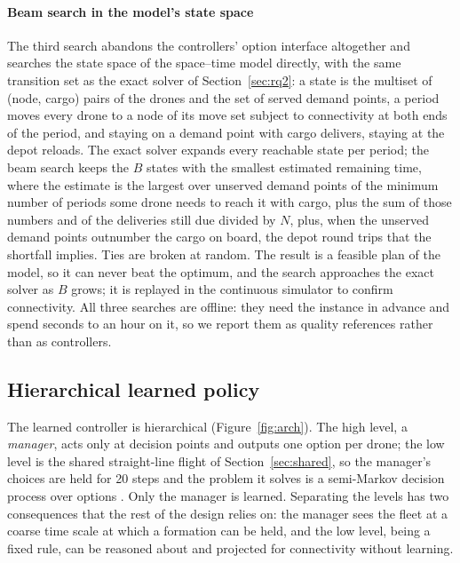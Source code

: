 \documentclass[final,5p,times,twocolumn]{elsarticle}
\begin{document}
\paragraph{Beam search in the model's state space}
The third search abandons the controllers' option interface altogether and searches the state
space of the space--time model directly, with the same transition set as the exact solver of
Section~\ref{sec:rq2}: a state is the multiset of (node, cargo) pairs of the drones and the set of
served demand points, a period moves every drone to a node of its move set subject to
connectivity at both ends of the period, and staying on a demand point with cargo delivers,
staying at the depot reloads. The exact solver expands every reachable state per period; the beam
search keeps the $B$ states with the smallest estimated remaining time, where the estimate is the
largest over unserved demand points of the minimum number of periods some drone needs to reach it
with cargo, plus the sum of those numbers and of the deliveries still due divided by $N$, plus,
when the unserved demand points outnumber the cargo on board, the depot round trips that the
shortfall implies. Ties are broken at random. The result is a feasible plan of the model, so it
can never beat the optimum, and the search approaches the exact solver as $B$ grows; it is
replayed in the continuous simulator to confirm connectivity. All three searches are offline: they
need the instance in advance and spend seconds to an hour on it, so we report them as quality
references rather than as controllers.

\subsection{Hierarchical learned policy}
\label{sec:learned}

The learned controller is hierarchical (Figure~\ref{fig:arch}). The high level, a \emph{manager},
acts only at decision points and outputs one option per drone; the low level is the shared
straight-line flight of Section~\ref{sec:shared}, so the manager's choices are held for 20 steps
and the problem it solves is a semi-Markov decision process over options \cite{sutton1999}.
Only the manager is learned. Separating the levels has two consequences that the rest of the
design relies on: the manager sees the fleet at a coarse time scale at which a formation can be
held, and the low level, being a fixed rule, can be reasoned about and projected for connectivity
without learning.
\end{document}

